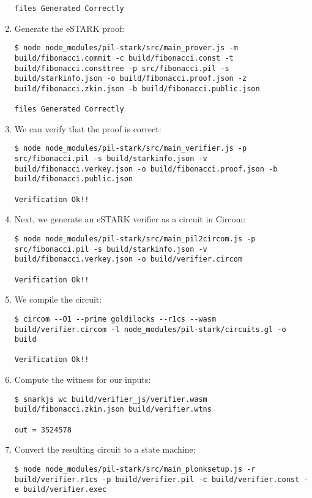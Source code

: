 \begin{enumerate}
\begin{lstlisting}[style=termt]
files Generated Correctly
\end{lstlisting}

\item Generate the eSTARK proof:
\begin{lstlisting}[style=termt]
$ node node_modules/pil-stark/src/main_prover.js -m build/fibonacci.commit -c build/fibonacci.const -t build/fibonacci.consttree -p src/fibonacci.pil -s build/starkinfo.json -o build/fibonacci.proof.json -z build/fibonacci.zkin.json -b build/fibonacci.public.json

files Generated Correctly
\end{lstlisting}

\item We can verify that the proof is correct:
\begin{lstlisting}[style=termt]
$ node node_modules/pil-stark/src/main_verifier.js -p src/fibonacci.pil -s build/starkinfo.json -v build/fibonacci.verkey.json -o build/fibonacci.proof.json -b build/fibonacci.public.json

Verification Ok!!
\end{lstlisting}

\item Next, we generate an eSTARK verifier as a circuit in Circom:
\begin{lstlisting}[style=termt]
$ node node_modules/pil-stark/src/main_pil2circom.js -p src/fibonacci.pil -s build/starkinfo.json -v build/fibonacci.verkey.json -o build/verifier.circom

Verification Ok!!
\end{lstlisting}

\item We compile the circuit:
\begin{lstlisting}[style=termt]
$ circom --O1 --prime goldilocks --r1cs --wasm build/verifier.circom -l node_modules/pil-stark/circuits.gl -o build

Verification Ok!!
\end{lstlisting}

\item Compute the witness for our inputs:
\begin{lstlisting}[style=termt]
$ snarkjs wc build/verifier_js/verifier.wasm build/fibonacci.zkin.json build/verifier.wtns

out = 3524578
\end{lstlisting}

\item Convert the resulting circuit to a state machine:
\begin{lstlisting}[style=termt]
$ node node_modules/pil-stark/src/main_plonksetup.js -r build/verifier.r1cs -p build/verifier.pil -c build/verifier.const -e build/verifier.exec


\end{lstlisting}
\end{enumerate}
